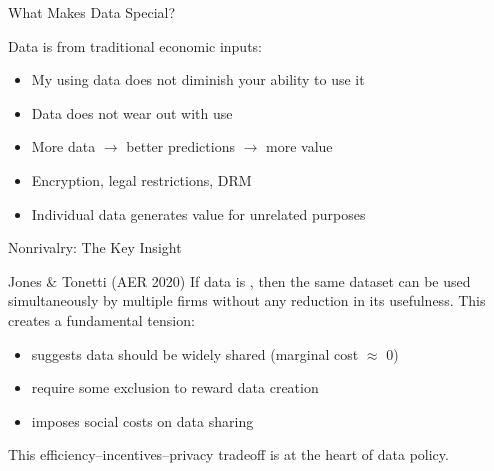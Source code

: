 \documentclass{beamer}
\begin{document}
\begin{frame}{What Makes Data Special?}

    Data is  from traditional economic inputs:

    \vspace{0.5em}
    \begin{itemize}
        \item {} My using data does not diminish your ability to use it
        \item {} Data does not wear out with use
        \item {} More data $\rightarrow$ better predictions $\rightarrow$ more value
        \item {} Encryption, legal restrictions, DRM
        \item {} Individual data generates value for unrelated purposes
    \end{itemize}

    \vspace{0.5em}

\end{frame}

\begin{frame}{Nonrivalry: The Key Insight}

    \begin{exampleblock}{Jones \& Tonetti (AER 2020)}
        If data is , then the same dataset can be used simultaneously by multiple firms without any reduction in its usefulness. This creates a fundamental tension:
    \end{exampleblock}

    \vspace{0.5em}
    \begin{itemize}
        \item {} suggests data should be widely shared (marginal cost $\approx$ 0)
        \item {} require some exclusion to reward data creation
        \item {} imposes social costs on data sharing
    \end{itemize}

    \vspace{0.5em}
    This efficiency--incentives--privacy tradeoff is at the heart of data policy.

    \vspace{0.3em}

\end{frame}
\end{document}
